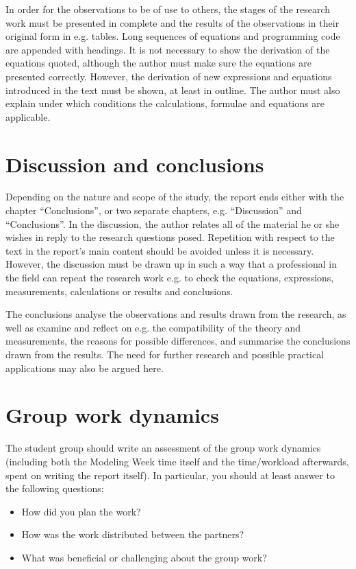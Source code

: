 \documentclass[12pt, sumlimits, intlimits]{article}
\begin{document}
In order for the observations to be of use to others, the stages of the
research work must be presented in complete and the results of the observations
in their original form in e.g. tables. Long sequences of equations and
programming code are appended with headings. It is not necessary to show the
derivation of the equations quoted, although the author must make sure the
equations are presented correctly. However, the derivation of new expressions
and equations introduced in the text must be shown, at least in outline. The
author must also explain under which conditions the calculations, formulae and
equations are applicable.

\section{Discussion and conclusions}

Depending on the nature and scope of the study, the report ends either with the
chapter ``Conclusions'', or two separate chapters, e.g. ``Discussion'' and
``Conclusions''. In the discussion, the author relates all of the material he
or she wishes in reply to the research questions posed. Repetition with respect
to the text in the report's main content should be avoided unless it is
necessary. However, the discussion must be drawn up in such a way that a
professional in the field can repeat the research work e.g. to check the
equations, expressions, measurements, calculations or results and conclusions.

The conclusions analyse the observations and results drawn from the research,
as well as examine and reflect on e.g. the compatibility of the theory and
measurements, the reasons for possible differences, and summarise the
conclusions drawn from the results. The need for further research and possible
practical applications may also be argued here.

\section{Group work dynamics}

The student group should write an assessment of the group work dynamics
(including both the Modeling Week time itself and the time/workload afterwards,
spent on writing the report itself). In particular, you should at least answer
to the following questions:
\begin{itemize}
\item How did you plan the work?
\item How was the work distributed between the partners?
\item What was beneficial or challenging about the group work?
\end{itemize}
\end{document}
